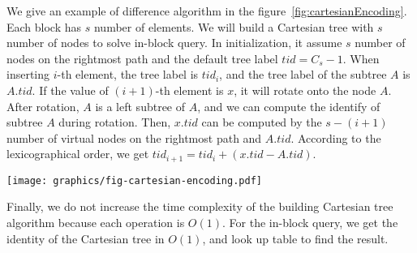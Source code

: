 We give an example of difference algorithm in the
figure~\ref{fig:cartesianEncoding}.   Each block has $s$ number of
elements.  We will build a Cartesian tree with $s$ number of nodes to
solve in-block query.  In initialization, it assume $s$ number of nodes
on the rightmost path and the default tree label $\mathit{tid} = C_s -
1$.  When inserting $i$-th element, the tree label is $\mathit{tid}_i$,
and the tree label of the subtree $A$ is $A.\mathit{tid}$.  If the value
of $(i+1)$-th element is $x$, it will rotate onto the node $A$.  After
rotation, $A$ is a left subtree of $A$, and we can compute the identify
of subtree $A$ during rotation.  Then, $x.\mathit{tid}$ can be computed
by the $s-(i+1)$ number of virtual nodes on the rightmost path and
$A.\mathit{tid}$. According to the lexicographical order, we get
$\mathit{tid}_{i+1} = \mathit{tid}_i + (x.\mathit{tid} -
A.\mathit{tid})$.



\begin{figure*}[!thb]
  \centering
  \texttt{[image: graphics/fig-cartesian-encoding.pdf]}

  \caption{An example for difference algorithm to encode Cartesian tree.}

  \label{fig:cartesianEncoding}
\end{figure*}

Finally, we do not increase the time complexity of the building
Cartesian tree algorithm because each operation is $O(1)$.  For the
in-block query, we get the identity of the Cartesian tree in $O(1)$,
and look up table to find the result.

\iffalse
最後，我們不改變原本的建立笛卡爾樹算法，便能在過程中擭得樹的編號，
每一次的 in-block 詢問只需要一次記憶體存取，得到任一操作攤銷複雜度 $\theta(1)$。
\fi
